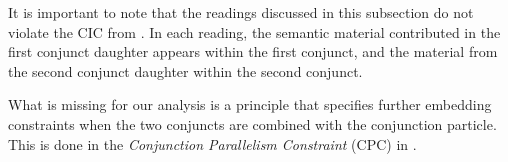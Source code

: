\documentclass[output=paper]{langsci/langscibook}
\begin{document}






\medskip%
It is important to note that the readings discussed in this subsection do not violate the CIC from . 
In each reading, the semantic material contributed in the first conjunct daughter appears within the first conjunct, and the material from the second conjunct daughter within the second conjunct.

What is missing for our analysis is a principle that specifies further embedding constraints when the two conjuncts are combined with the conjunction particle. This is done in the \emph{Conjunction Parallelism Constraint} (CPC) in .
\end{document}
